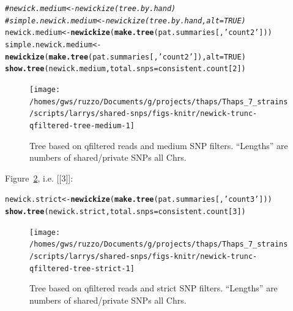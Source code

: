 \documentclass{article}\usepackage[]{graphicx}\usepackage[]{color}
\makeatletter
\newcommand{\hlnum}[1]{\textcolor[rgb]{0.686,0.059,0.569}{#1}}%
\newcommand{\hlstr}[1]{\textcolor[rgb]{0.192,0.494,0.8}{#1}}%
\newcommand{\hlcom}[1]{\textcolor[rgb]{0.678,0.584,0.686}{\textit{#1}}}%
\newcommand{\hlstd}[1]{\textcolor[rgb]{0.345,0.345,0.345}{#1}}%
\newcommand{\hlkwb}[1]{\textcolor[rgb]{0.69,0.353,0.396}{#1}}%
\newcommand{\hlkwc}[1]{\textcolor[rgb]{0.333,0.667,0.333}{#1}}%
\newcommand{\hlkwd}[1]{\textcolor[rgb]{0.737,0.353,0.396}{\textbf{#1}}}%
\newenvironment{kframe}{%
 \def\at@end@of@kframe{}%
 \ifinner\ifhmode%
  \def\at@end@of@kframe{\end{minipage}}%
  \begin{minipage}{\columnwidth}%
 \fi\fi%
 \def\FrameCommand##1{\hskip\@totalleftmargin \hskip-\fboxsep
 \colorbox{shadecolor}{##1}\hskip-\fboxsep
     \hskip-\linewidth \hskip-\@totalleftmargin \hskip\columnwidth}%
 \MakeFramed {\advance\hsize-\width
   \@totalleftmargin\z@ \linewidth\hsize
   \@setminipage}}%
 {\par\unskip\endMakeFramed%
 \at@end@of@kframe}
\newenvironment{knitrout}{}{} %
\makeatother
\begin{document}
\begin{knitrout}\scriptsize
{}\color{fgcolor}\begin{kframe}
\begin{alltt}
\hlcom{# newick.medium <- newickize(tree.by.hand)}
\hlcom{# simple.newick.medium <- newickize(tree.by.hand,alt=TRUE)}
\hlstd{newick.medium} \hlkwb{<-} \hlkwd{newickize}\hlstd{(}\hlkwd{make.tree}\hlstd{(pat.summaries[,}\hlstr{'count2'}\hlstd{]))}
\hlstd{simple.newick.medium} \hlkwb{<-} \hlkwd{newickize}\hlstd{(}\hlkwd{make.tree}\hlstd{(pat.summaries[,}\hlstr{'count2'}\hlstd{]),}\hlkwc{alt}\hlstd{=}\hlnum{TRUE}\hlstd{)}
\hlkwd{show.tree}\hlstd{(newick.medium,} \hlkwc{total.snps}\hlstd{=consistent.count[}\hlnum{2}\hlstd{])}
\end{alltt}
\end{kframe}\begin{figure}

{\centering \texttt{[image: /homes/gws/ruzzo/Documents/g/projects/thaps/Thaps\_7\_strains/scripts/larrys/shared-snps/figs-knitr/newick-trunc-qfiltered-tree-medium-1]} 

}

\caption[Tree based on qfiltered reads and medium SNP filters]{Tree based on qfiltered reads and medium SNP filters.  ``Lengths'' are numbers of shared/private SNPs all Chrs.}\label{fig:tree-medium}
\end{figure}


\end{knitrout}

Figure~\ref{fig:tree-strict}, i.e. [[3]]:

\begin{knitrout}\scriptsize
{}\color{fgcolor}\begin{kframe}
\begin{alltt}
\hlstd{newick.strict} \hlkwb{<-} \hlkwd{newickize}\hlstd{(}\hlkwd{make.tree}\hlstd{(pat.summaries[,}\hlstr{'count3'}\hlstd{]))}
\hlkwd{show.tree}\hlstd{(newick.strict,} \hlkwc{total.snps}\hlstd{=consistent.count[}\hlnum{3}\hlstd{])}
\end{alltt}
\end{kframe}\begin{figure}

{\centering \texttt{[image: /homes/gws/ruzzo/Documents/g/projects/thaps/Thaps\_7\_strains/scripts/larrys/shared-snps/figs-knitr/newick-trunc-qfiltered-tree-strict-1]} 

}

\caption[Tree based on qfiltered reads and strict SNP filters]{Tree based on qfiltered reads and strict SNP filters.  ``Lengths'' are numbers of shared/private SNPs all Chrs.}\label{fig:tree-strict}
\end{figure}


\end{knitrout}
\end{document}
